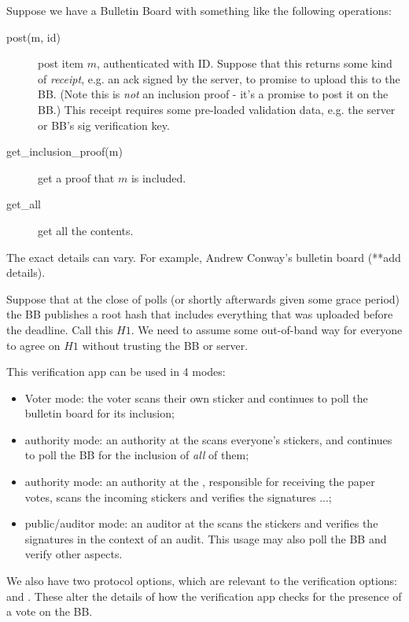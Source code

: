 \documentclass{article}
\begin{document}
Suppose we have a Bulletin Board with something like the following operations:
    \begin{description}
        \item[post(m, id)] post item $m$, authenticated with ID. Suppose that this returns some kind of \emph{receipt}, e.g. an ack signed by the server, to promise to upload this to the BB. (Note this is \emph{not} an inclusion proof - it's a promise to post it on the BB.) This receipt requires some pre-loaded validation data, e.g. the server or BB's sig verification key.
        \item[get\_inclusion\_proof(m)] get a proof that $m$ is included.
        \item[get\_all] get all the contents.
    \end{description}
    The exact details can vary. For example, Andrew Conway's bulletin board (**add details).

    Suppose that at the close of polls (or shortly afterwards given some grace period) the BB publishes a root hash that includes everything that was uploaded before the deadline. Call this $H1$. We need to assume some out-of-band way for everyone to agree on $H1$ without trusting the BB or server.



    This verification app can be used in 4 modes:
    \begin{itemize}
        \item Voter mode: the voter scans their own sticker and continues to poll the bulletin board for its inclusion;
        \item \remoteVotingCenter{} authority mode: an authority at the \remoteVotingCenter{} scans everyone's stickers, and continues to poll the BB for the inclusion of \emph{all} of them;
        \item \localVotingCenter{} authority mode: an authority at the \localVotingCenter{}, responsible for receiving the paper votes, scans the incoming stickers and verifies the signatures ...;
        \item \localVotingCenter{} public/auditor mode: an auditor at the \localVotingCenter{} scans the stickers and verifies the signatures in the context of an audit. This usage may also poll the BB and verify other aspects.
    \end{itemize}

    We also have two protocol options, which are relevant to the verification options:
    \BBInclusionCheck{} and \StickerBBUpload{}. These alter the details of how the verification app checks for the presence of a vote on the BB.
\end{document}

